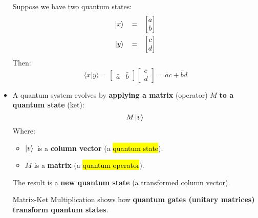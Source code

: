 \begin{itemize}
    \begin{examplebox}
        Suppose we have two quantum states:
        \begin{equation*}
            \begin{array}{rcl}
                \left| x \rangle\right. &=& \begin{bmatrix}
                    a \\ b
                \end{bmatrix} \\ [1em]
                \left| y \rangle\right. &=& \begin{bmatrix}
                    c \\ d
                \end{bmatrix}
            \end{array}
        \end{equation*}
        Then:
        \begin{equation*}
            \langle x | y \rangle = \begin{bmatrix}
                \bar{a} & \bar{b}
            \end{bmatrix}
            \begin{bmatrix}
                c \\ d
            \end{bmatrix}
            = \bar{a}c + \bar{b}d
        \end{equation*}
    \end{examplebox}


    \item {}

    A quantum system evolves by \textbf{applying a matrix} (operator) $M$ \textbf{to a quantum state} (ket):
    \begin{equation*}
        M \left| v \rangle\right.
    \end{equation*}
    Where:
    \begin{itemize}
        \item $\left| v \rangle\right.$ is a \textbf{column vector} (a \hl{quantum state}).
        \item $M$ is a \textbf{matrix} (a \hl{quantum operator}).
    \end{itemize}
    The result is a \textbf{new quantum state} (a transformed column vector).

    Matrix-Ket Multiplication shows how \textbf{quantum gates (unitary matrices) transform quantum states}.


\end{itemize}
